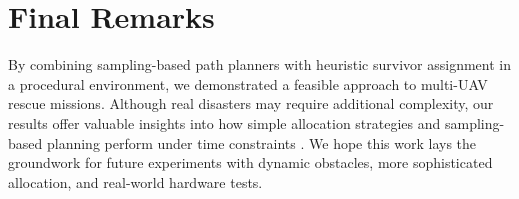 \documentclass[12pt,a4paper]{report}
\begin{document}
\section{Final Remarks}
By combining sampling-based path planners with heuristic survivor assignment in a
procedural environment, we demonstrated a feasible approach to multi-UAV rescue
missions. Although real disasters may require additional complexity, our results
offer valuable insights into how simple allocation strategies and sampling-based
planning perform under time constraints \cite{Erdelj2017MultiUAV,Daud2022DroneDisaster,Murphy2016DisasterRoboticsNepal}.
We hope this work lays the groundwork for future experiments with dynamic obstacles,
more sophisticated allocation, and real-world hardware tests.



\end{document}

